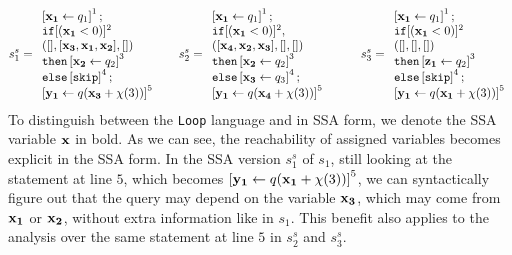 \[
 s_1^{s} = \begin{array}{l}
      \left[  \mathrel{ {{\bf{{x_1}}}} \leftarrow q_1 } \right]^{1} ; \\
      \mathtt{if}  [({{\bf{{x_1}}} }< 0 )]^{2}\\
      ([], [{ {\bf{{x_3, x_1,x_2}}} }], []) \\
      \mathtt{then} \left[ \mathrel{ {{\bf{{x_2}}}} \leftarrow q_2 } \right]^{3}\\
      \mathtt{else} \left[ \mathtt{skip} \right]^{4} ; \\
      \left[ \mathrel{ {{\bf{{y_1}}}} \leftarrow q({{\bf{{x_3}}} + \chi(3)}) } \right]^{5}
 \end{array}
 ~~~~~
  s_2^{s} = \begin{array}{l}
      \left[  \mathrel{ {{\bf{{x_1}}}} \leftarrow q_1 } \right]^{1} ; \\
      \mathtt{if}  [({{\bf{{x_1}}}} < 0 )]^{2}, \\
      ( [{{\bf{{x_4, x_2,x_3}}}}], [], [] ) \\
      \mathtt{then} \left[ \mathrel{ {{\bf{{x_2}}}} \leftarrow q_2 } \right]^{3}\\
      \mathtt{else} \left[ \mathrel{ {{\bf{{x_3}}}} \leftarrow q_3 } \right]^{4} ; \\
      \left[ \mathrel{ {{\bf{{y_1}}}} \leftarrow q({{\bf{{x_4}}}}+\chi(3)) } \right]^{5}
 \end{array}
 ~~~~~~~~
  s_3^{s} = \begin{array}{l}
      \left[  \mathrel{ {{\bf{{x_1}}}} \leftarrow q_1 } \right]^{1} ; \\
      \mathtt{if}  [({{\bf{{x_1}}}} < 0 )]^{2} \\
       ( [], [], [] ) \\
      \mathtt{then} \left[ \mathrel{ {{\bf{{z_1}}}} \leftarrow q_2 } \right]^{3}\\
      \mathtt{else} \left[ \mathtt{skip} \right]^{4} ; \\
      \left[ \mathrel{ {{\bf{{y_1}}}} \leftarrow q({{\bf{{x_1}}}}+\chi(3)) } \right]^{5}
 \end{array}
\]
%
To distinguish between the {\tt Loop} language and in SSA form, we denote the SSA variable ${{\bf{{x}}}}$ in bold. As we can see, the reachability of assigned variables becomes explicit in the SSA form. In the SSA version $s_1^s$ of $s_1$, still looking at the statement at line $5$, which becomes $\left[ \mathrel{ {{\bf{{y_1}}}} \leftarrow q({{\bf{{x_1}}}}+\chi(3)) } \right]^{5} $, we can syntactically figure out that the query may depend on the variable ${\bf{{x_3}}}$, which may come from ${\bf{{x_1}}}$ or ${\bf{{x_2}}}$, without extra information like in $s_1$. This benefit also applies to the analysis over the same statement at line $5$ in $s_2^s$ and $s_3^s$.  
%
%
%
%
